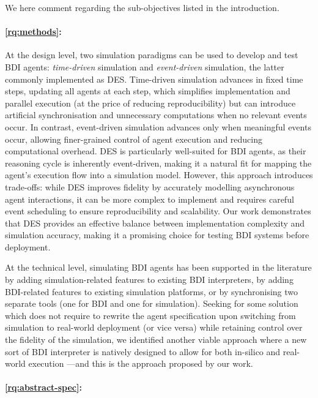 We here comment regarding the sub-objectives listed in the introduction.

\paragraph{\ref{rq:methods}: }

At the design level,
two simulation paradigms can be used to develop and test \ac{BDI} agents:
\emph{time-driven} simulation and \emph{event-driven} simulation,
the latter commonly implemented as \ac{DES}.
%
Time-driven simulation advances in fixed time steps, updating all agents at each step,
which simplifies implementation and parallel execution
(at the price of reducing reproducibility)
but can introduce artificial synchronisation
and unnecessary computations when no relevant events occur.
%
In contrast,
event-driven simulation advances only when meaningful events occur,
allowing finer-grained control of agent execution and reducing computational overhead.
%
\ac{DES} is particularly well-suited for \ac{BDI} agents,
as their reasoning cycle is inherently event-driven,
making it a natural fit for mapping the agent’s execution flow into a simulation model.
%
However,
this approach introduces trade-offs:
while \ac{DES} improves fidelity by accurately modelling asynchronous agent interactions,
it can be more complex to implement and requires careful event scheduling
to ensure reproducibility and scalability.
%
Our work demonstrates that \ac{DES} provides an effective balance between
implementation complexity and simulation accuracy,
making it a promising choice for testing \ac{BDI} systems before deployment.

At the technical level,
simulating \ac{BDI} agents has been supported in the literature by
adding simulation-related features to existing \ac{BDI} interpreters,
by adding \ac{BDI}-related features to existing simulation platforms,
or by synchronising two separate tools
(one for \ac{BDI} and one for simulation).
%
Seeking for some solution which does not require to rewrite the agent specification
upon switching from simulation to real-world deployment (or vice versa)
while retaining control over the fidelity of the simulation,
we identified another viable approach where a new sort of \ac{BDI} interpreter is natively designed
to allow for both in-silico and real-world execution%
---and this is the approach proposed by our work.

\paragraph{
    \ref{rq:abstract-spec}:
}

